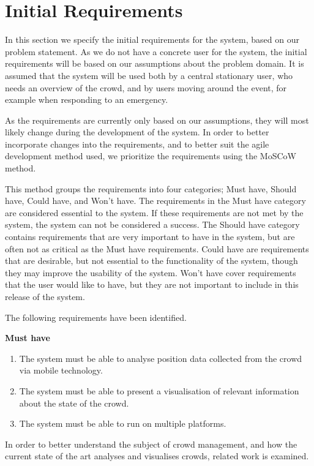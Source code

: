 \section{Initial Requirements}\label{sec:s1_requirements}


In this section we specify the initial requirements for the system, based on our problem statement. As we do not have a concrete user for the system, the initial requirements will be based on our assumptions about the problem domain. It is assumed that the system will be used both by a central stationary user, who needs an overview of the crowd, and by users moving around the event, for example when responding to an emergency. 

As the requirements are currently only based on our assumptions, they will most likely change during the development of the system. In order to better incorporate changes into the requirements, and to better suit the agile development method used, we prioritize the requirements using the MoSCoW method.

This method groups the requirements into four categories; Must have, Should have, Could have, and Won't have. The requirements in the Must have category are considered essential to the system. If these requirements are not met by the system, the system can not be considered a success. The Should have category contains requirements that are very important to have in the system, but are often not as critical as the Must have requirements. Could have are requirements that are desirable, but not essential to the functionality of the system, though they may improve the usability of the system. Won't have cover requirements that the user would like to have, but they are not important to include in this release of the system.

The following requirements have been identified.

\textbf{Must have}
\begin{enumerate}
    \item The system must be able to analyse position data collected from the crowd via mobile technology.
    \item The system must be able to present a visualisation of relevant information about the state of the crowd.
    \item The system must be able to run on multiple platforms.
\end{enumerate}

In order to better understand the subject of crowd management, and how the current state of the art analyses and visualises crowds, related work is examined.


